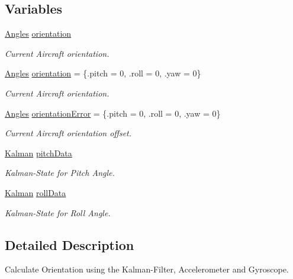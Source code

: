 \subsection*{Variables}
\begin{DoxyCompactItemize}
\item 
\hyperlink{struct_angles}{Angles} \hyperlink{group__orientation_gacd4a2942520b68691db5aebde4e537a4}{orientation}
\begin{DoxyCompactList}\small\item\em Current Aircraft orientation. \end{DoxyCompactList}\item 
\hyperlink{struct_angles}{Angles} \hyperlink{group__orientation_gacd4a2942520b68691db5aebde4e537a4}{orientation} = \{.pitch = 0, .roll = 0, .yaw = 0\}
\begin{DoxyCompactList}\small\item\em Current Aircraft orientation. \end{DoxyCompactList}\item 
\hyperlink{struct_angles}{Angles} \hyperlink{group__orientation_gab42c272957b0a5cdc11845ade183c2f9}{orientation\-Error} = \{.pitch = 0, .roll = 0, .yaw = 0\}
\begin{DoxyCompactList}\small\item\em Current Aircraft orientation offset. \end{DoxyCompactList}\item 
\hyperlink{struct_kalman}{Kalman} \hyperlink{group__orientation_gaee2ebdd37342c4cfa69ce7ee1440fd1d}{pitch\-Data}
\begin{DoxyCompactList}\small\item\em Kalman-\/\-State for Pitch Angle. \end{DoxyCompactList}\item 
\hyperlink{struct_kalman}{Kalman} \hyperlink{group__orientation_ga327c51463b7ca66c1ed8d0f400ffbfec}{roll\-Data}
\begin{DoxyCompactList}\small\item\em Kalman-\/\-State for Roll Angle. \end{DoxyCompactList}\end{DoxyCompactItemize}


\subsection{Detailed Description}
Calculate Orientation using the Kalman-\/\-Filter, Accelerometer and Gyroscope. 

